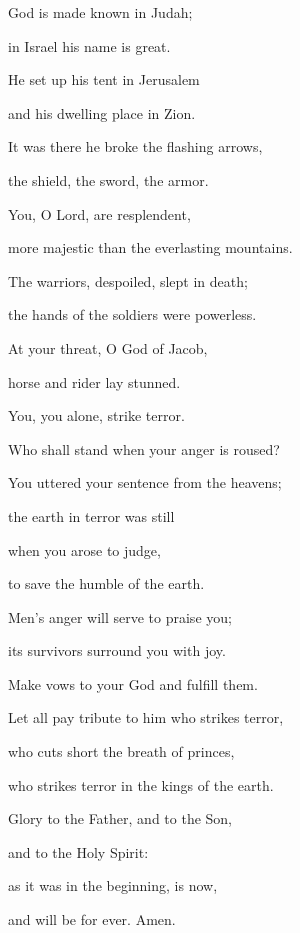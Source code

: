 \noindent God is made known in Judah;~\GreStar{}~\nopagebreak

in Israel his name is great.

\noindent He set up his tent in Jerusalem~\GreStar{}~\nopagebreak

and his dwelling place in Zion.

\noindent It was there he broke the flashing arrows,~\GreStar{}~\nopagebreak

the shield, the sword, the armor.

\noindent You, O Lord, are resplendent,~\GreStar{}~\nopagebreak

more majestic than the everlasting mountains.

\noindent The warriors, despoiled, slept in death;~\GreStar{}~\nopagebreak

the hands of the soldiers were powerless.

\noindent At your threat, O God of Jacob,~\GreStar{}~\nopagebreak

horse and rider lay stunned.

\noindent You, you alone, strike terror.~\GreStar{}~\nopagebreak

Who shall stand when your anger is roused?

\noindent You uttered your sentence from the heavens;~\GreStar{}~\nopagebreak

the earth in terror was still

\noindent when you arose to judge,~\GreStar{}~\nopagebreak

to save the humble of the earth.

\noindent Men’s anger will serve to praise you;~\GreStar{}~\nopagebreak

its survivors surround you with joy.

\noindent Make vows to your God and fulfill them.~\GreStar{}~\nopagebreak

Let all pay tribute to him who strikes terror,

\noindent who cuts short the breath of princes,~\GreStar{}~\nopagebreak

who strikes terror in the kings of the earth.

\noindent Glory to the Father, and to the Son,~\GreStar{}~\nopagebreak

and to the Holy Spirit:

\noindent as it was in the beginning, is now,~\GreStar{}~\nopagebreak

and will be for ever. Amen.
